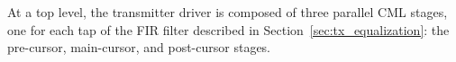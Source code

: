 At a top level, the transmitter driver is composed of three parallel \ac{CML} stages, one for each tap of the \ac{FIR} filter described in Section~\ref{sec:tx_equalization}: the pre-cursor, main-cursor, and post-cursor stages. 

